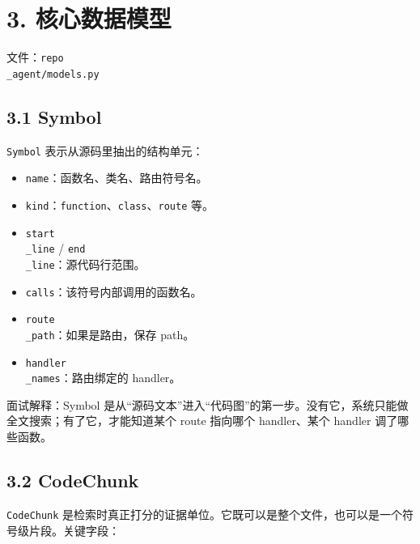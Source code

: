 \documentclass[UTF8,12pt,openany]{ctexbook}
\begin{document}
\section{3. 核心数据模型}

文件：\texttt{repo\\_agent/models.py}\par

\subsection{3.1 Symbol}

\texttt{Symbol} 表示从源码里抽出的结构单元：\par

\begin{itemize}
\item \texttt{name}：函数名、类名、路由符号名。
\item \texttt{kind}：\texttt{function}、\texttt{class}、\texttt{route} 等。
\item \texttt{start\\_line} / \texttt{end\\_line}：源代码行范围。
\item \texttt{calls}：该符号内部调用的函数名。
\item \texttt{route\\_path}：如果是路由，保存 path。
\item \texttt{handler\\_names}：路由绑定的 handler。
\end{itemize}

面试解释：Symbol 是从“源码文本”进入“代码图”的第一步。没有它，系统只能做全文搜索；有了它，才能知道某个 route 指向哪个 handler、某个 handler 调了哪些函数。\par

\subsection{3.2 CodeChunk}

\texttt{CodeChunk} 是检索时真正打分的证据单位。它既可以是整个文件，也可以是一个符号级片段。关键字段：\par
\end{document}
